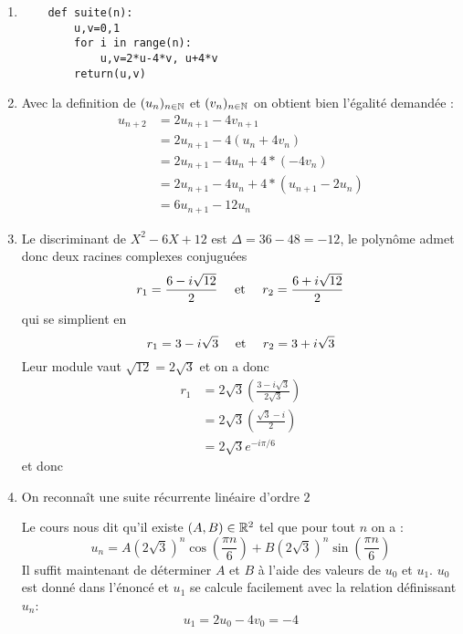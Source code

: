 \documentclass[a4paper, 11pt]{article}
\begin{document}
\begin{correction}
    \begin{enumerate}
    \item 
\begin{lstlisting}
    def suite(n):
        u,v=0,1
        for i in range(n):
            u,v=2*u-4*v, u+4*v
        return(u,v)
\end{lstlisting}
    

    
   \item Avec la definition de $(u_n)_{n\in \mathbb{N}}$ et $(v_n)_{n\in \mathbb{N}}$ on obtient bien l'égalité demandée :
         \begin{align*}
            u_{n+2}&= 2u_{n+1} -4v_{n+1}\\
            &= 2u_{n+1} -4(u_n+4v_n)\\
            &=2u_{n+1} -4u_n +4*(-4v_n)\\
            &=2u_{n+1} -4u_n +4*(u_{n+1}-2u_n)\\
            &=6u_{n+1} -12u_n
        \end{align*}
\item Le discriminant de $X^2-6X+12$ est 
$\Delta= 36-48=-12$, le polynôme admet donc deux racines complexes conjuguées
$$r_1 = \frac{6-i\sqrt{12}}{2} \quad \text{ et } \quad r_2 = \frac{6+i\sqrt{12}}{2} $$
qui se simplient en 
$$r_1 = 3-i\sqrt{3} \quad \text{ et } \quad r_2 = 3+i\sqrt{3}$$
Leur module vaut $\sqrt{12}=2\sqrt{3}$ et on a donc 
\begin{align*}
r_1 &=2\sqrt{3}\left(\frac{3-i\sqrt{3}}{2\sqrt{3}} \right)    \\
    &= 2\sqrt{3}\left(\frac{\sqrt{3}-i}{2} \right) \\
    &=2\sqrt{3}e^{-i\pi/6}
\end{align*}
et donc 

\item 

On reconnaît une suite récurrente linéaire d'ordre $2$

Le cours nous dit qu'il existe $(A,B)\in \mathbb{R}^2$ tel que pour tout $n$ on a :
$$u_n = A(2\sqrt{3})^n\cos(\frac{\pi n}{6}) +B(2\sqrt{3})^n\sin(\frac{\pi n}{6})$$
Il suffit maintenant de déterminer $A$ et $B$ à l'aide des valeurs de $u_0$ et $u_1$. $u_0$ est donné dans l'énoncé et $u_1$ se calcule facilement avec la relation définissant $u_n$:
$$u_1 = 2u_0 -4v_0= -4$$


\end{enumerate}
\end{correction}
\end{document}
